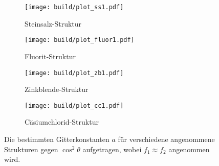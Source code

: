 \begin{figure}[hhh]
  \centering
  \begin{subfigure}{.45\textwidth}
    \centering
    \texttt{[image: build/plot\_ss1.pdf]}
    \caption{Steinsalz-Struktur}
    \label{subfig:ss1}
  \end{subfigure}
  \begin{subfigure}{.45\textwidth}
    \centering
    \texttt{[image: build/plot\_fluor1.pdf]}
    \caption{Fluorit-Struktur}
    \label{subfig:fluo1}
  \end{subfigure}
  \begin{subfigure}{.45\textwidth}
    \centering
    \texttt{[image: build/plot\_zb1.pdf]}
    \caption{Zinkblende-Struktur}
    \label{subfig:zb1}
  \end{subfigure}
  \begin{subfigure}{.45\textwidth}
    \centering
    \texttt{[image: build/plot\_cc1.pdf]}
    \caption{Cäsiumchlorid-Struktur}
    \label{subfig:cc1}
  \end{subfigure}
  \caption{Die bestimmten Gitterkonstanten $a$ für verschiedene angenommene Strukturen gegen $\cos^2\theta$ aufgetragen, wobei
  $f_1\approx f_2$ angenommen wird.}
  \label{fig:salz1}
\end{figure}


